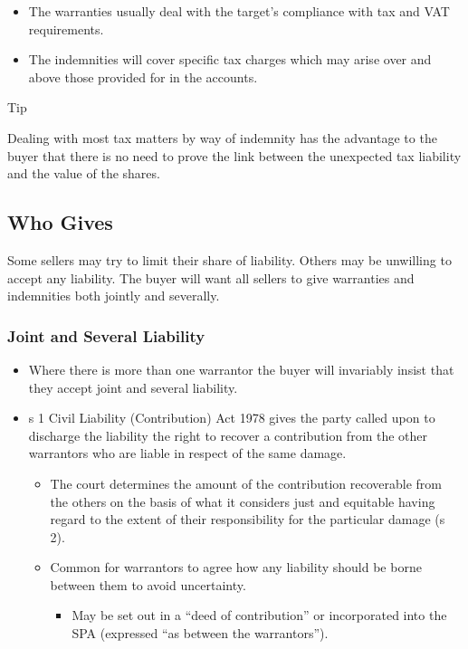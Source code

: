 \documentclass[
]{article}
\providecommand{\tightlist}{%
  \setlength{\itemsep}{0pt}\setlength{\parskip}{0pt}}
\newenvironment{env-8073ffbe-6656-43d2-bf4d-97e604cb2369}
{
    \savenotes\tcolorbox[blanker,breakable,left=5pt,borderline west={2pt}{-4pt}{cyan}]
}
{
    \endtcolorbox\spewnotes
}
\begin{document}
\begin{itemize}
\tightlist
\item
  The warranties usually deal with the target's compliance with tax and
  VAT requirements.
\item
  The indemnities will cover specific tax charges which may arise over
  and above those provided for in the accounts.
\end{itemize}

\begin{env-8073ffbe-6656-43d2-bf4d-97e604cb2369}

Tip

Dealing with most tax matters by way of indemnity has the advantage to
the buyer that there is no need to prove the link between the unexpected
tax liability and the value of the shares.

\end{env-8073ffbe-6656-43d2-bf4d-97e604cb2369}

\hypertarget{who-gives}{%
\subsection{Who Gives}\label{who-gives}}

Some sellers may try to limit their share of liability. Others may be
unwilling to accept any liability. The buyer will want all sellers to
give warranties and indemnities both jointly and severally.

\hypertarget{joint-and-several-liability}{%
\subsubsection{Joint and Several
Liability}\label{joint-and-several-liability}}

\begin{itemize}
\tightlist
\item
  Where there is more than one warrantor the buyer will invariably
  insist that they accept joint and several liability.
\item
  s 1 Civil Liability (Contribution) Act 1978 gives the party called
  upon to discharge the liability the right to recover a contribution
  from the other warrantors who are liable in respect of the same
  damage.

  \begin{itemize}
  \tightlist
  \item
    The court determines the amount of the contribution recoverable from
    the others on the basis of what it considers just and equitable
    having regard to the extent of their responsibility for the
    particular damage (s 2).
  \item
    Common for warrantors to agree how any liability should be borne
    between them to avoid uncertainty.

    \begin{itemize}
    \tightlist
    \item
      May be set out in a ``deed of contribution'' or incorporated into
      the SPA (expressed ``as between the warrantors'').
    \end{itemize}
  \end{itemize}
\end{itemize}
\end{document}
